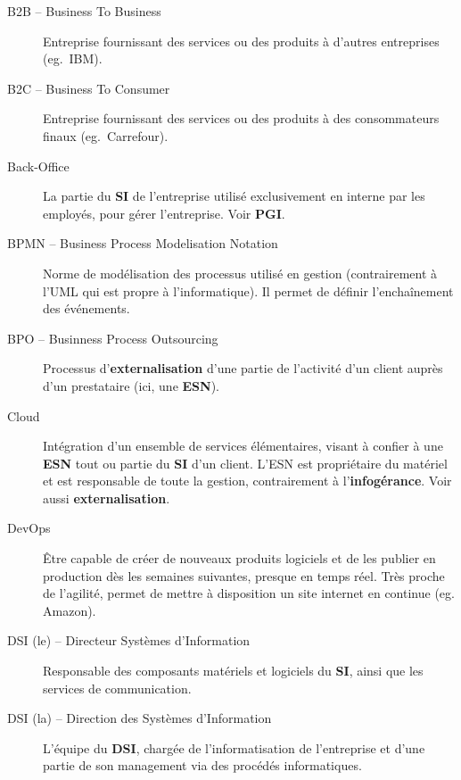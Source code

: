 \documentclass[10pt,a4paper,french]{article}
\begin{document}
\begin{description}

\item[B2B -- Business To Business] \label{glo:b2b} Entreprise fournissant des services ou des produits à d'autres entreprises (eg.~IBM).

\item[B2C -- Business To Consumer] \label{glo:b2c} Entreprise fournissant des services ou des produits à des consommateurs finaux (eg.~Carrefour).

\item[Back-Office]\label{glo:back-office} La partie du \textbf{SI} de l'entreprise utilisé exclusivement en interne par les employés, pour gérer l'entreprise. Voir \textbf{PGI}.

\item[BPMN -- Business Process Modelisation Notation]\label{glo:bpmn}
Norme de modélisation des processus utilisé en gestion (contrairement à l'UML qui est propre à l'informatique). Il permet de définir l'enchaînement des événements.

\item[BPO -- Businness Process Outsourcing]\label{glo:BPO}
Processus d'\textbf{externalisation} d'une partie de l'activité d'un client auprès d'un prestataire (ici, une \textbf{ESN}).

\item[Cloud]\label{glo:cloud}
Intégration d'un ensemble de services élémentaires, visant à confier à une \textbf{ESN} tout ou partie du \textbf{SI} d'un client. L'ESN est propriétaire du matériel et est responsable de toute la gestion, contrairement à l'\textbf{infogérance}. Voir aussi \textbf{externalisation}.

\item[DevOps]\label{glo:devops}
Être capable de créer de nouveaux produits logiciels et de les publier en production dès les semaines suivantes, presque en temps réel. Très proche de l'agilité, permet de mettre à disposition un site internet en continue (eg. Amazon).

\item[DSI (le) -- Directeur Systèmes d'Information]\label{glo:DSI-le} Responsable des composants matériels et logiciels du \textbf{SI}, ainsi que les services de communication.

\item[DSI (la) -- Direction des Systèmes d'Information]\label{glo:DSI-la} L'équipe du \textbf{DSI}, chargée de l'informatisation de l'entreprise et d'une partie de son management via des procédés informatiques.


\end{description}
\end{document}
